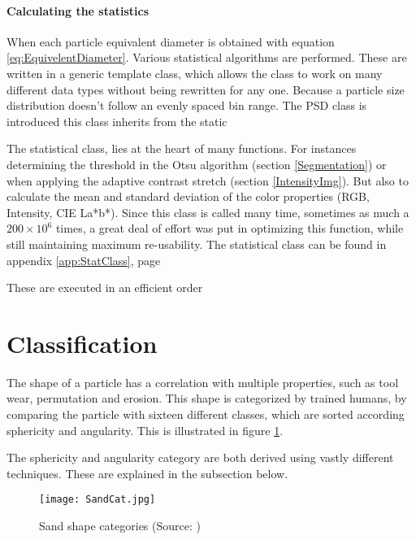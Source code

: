 \documentclass[11pt,fleqn,,a4paper,twoside,openright]{book}
\begin{document}
\paragraph{Calculating the statistics}
When each particle equivalent diameter is obtained with equation \ref{eq:EquivelentDiameter}. Various statistical algorithms are performed. These are written in a generic template class, which allows the class to work on many different data types without being rewritten for any one. Because a particle size distribution doesn't follow an evenly spaced bin range. The PSD class is introduced this class inherits from the static

\begin{remark}
	The statistical class, lies at the heart of many functions. For instances determining the threshold in the Otsu algorithm (section \ref{Segmentation}) or when  applying the adaptive contrast stretch (section \ref{IntensityImg}). But also to calculate the mean and standard deviation of the color properties (RGB, Intensity, CIE La*b*). Since this class is called many time, sometimes as much a $ 200 \times 10^{6} $ times, a great deal of effort was put in optimizing this function, while still maintaining maximum re-usability. The statistical class can be found in appendix \ref{app:StatClass}, page \pageref{app:StatClass}
\end{remark}
These are executed in an efficient order 

\section{Classification}
The shape of a particle has a correlation with multiple properties, such as tool wear, permutation and erosion. This shape is categorized by trained humans, by comparing the particle with sixteen different classes, which are sorted according sphericity and angularity. This is illustrated in figure \ref{fig:Sandcat}.

The sphericity and angularity category are both derived using vastly different techniques. These are explained in the subsection below.

\begin{figure}[h]
	\texttt{[image: SandCat.jpg]}
	\caption{Sand shape categories (Source: \citeauthor{miller2010quantifying} \cite{miller2010quantifying})}\label{fig:Sandcat}
\end{figure}
\end{document}
